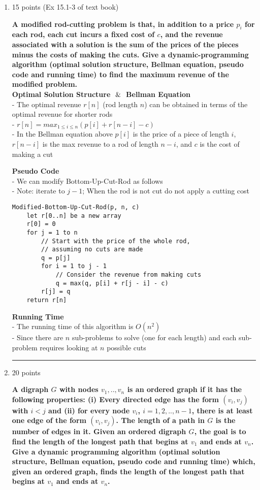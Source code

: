 \documentclass[letterpaper,12pt]{article}
\begin{document}
\begin{enumerate}
\noindent\rule{16cm}{0.1pt}
\item 15 points (Ex 15.1-3 of text book)

\textbf{A modified rod-cutting problem is that, in addition to a price $p_i$ for each rod,
each cut incurs a fixed cost of $c$, and the revenue associated with a solution is
the sum of the prices of the pieces minus the costs of making the cuts. Give a
dynamic-programming algorithm (optimal solution structure, Bellman equation, pseudo
code and running time) to find the maximum revenue of the modified problem.} \\

\textbf{Optimal Solution Structure $\And$ Bellman Equation} \\
- The optimal revenue $r[n]$ (rod length $n$) can be obtained in terms of the optimal revenue for shorter rods \\
- \(r[n] = max_{1 \leq i \leq n}(p[i] + r[n-i] - c)\) \\
- In the Bellman equation above $p[i]$ is the price of a piece of length $i$, $r[n-i]$ is the max revenue to a rod of length $n-i$, and $c$ is the cost of making a cut

\textbf{Pseudo Code} \\
- We can modify Bottom-Up-Cut-Rod as follows \\
- Note: iterate to $j-1$; When the rod is not cut do not apply a cutting cost
\begin{verbatim}
Modified-Bottom-Up-Cut-Rod(p, n, c)
    let r[0..n] be a new array
    r[0] = 0
    for j = 1 to n
        // Start with the price of the whole rod, 
        // assuming no cuts are made
        q = p[j]  
        for i = 1 to j - 1
            // Consider the revenue from making cuts
            q = max(q, p[i] + r[j - i] - c) 
        r[j] = q
    return r[n]
\end{verbatim}

\textbf{Running Time} \\
- The running time of this algorithm is $O(n^2)$ \\
- Since there are $n$ sub-problems to solve (one for each length) and each sub-problem requires looking at $n$ possible cuts

\noindent\rule{16cm}{0.1pt}
\item 20 points 

\textbf{A digraph $G$ with nodes $v_1,..,v_n$ is an ordered graph if it has the
following properties: (i) Every directed edge has the form $(v_i,v_j)$ with $i<j$
and (ii) for every node $v_i$, $i=1,2,..,n-1$, there is at least one edge of
the form $(v_i,v_j)$. The length of a path in $G$ is the number of edges in it.
Given an ordered digraph $G$, the goal is to find the length of the longest path
that begins at $v_1$ and ends at $v_n$. Give a dynamic programming algorithm 
(optimal solution structure, Bellman equation, pseudo code and running time) which,
given an ordered graph, finds the length of the longest path that begins at $v_1$
and ends at $v_n$.} \\


\end{enumerate}
\end{document}
